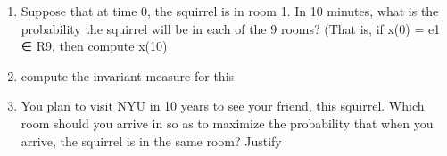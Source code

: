\documentclass[12pt,twoside]{article}
\begin{document}
\begin{enumerate}[label=6.3]
\begin{enumerate}
{\begin{itemize}
\end{itemize}

}
\item Suppose that at time 0, the squirrel is in room 1. In 10 minutes,
what is the probability the squirrel will be in each of the 9 rooms?
(That is, if x(0) = e1 ∈ R9, then compute x(10)
\item compute the invariant measure for this 
\item You plan to visit NYU in 10 years to see your friend, this squirrel.
Which room should you arrive in so as to maximize the probability
that when you arrive, the squirrel is in the same room? Justify
\end{enumerate}
\end{enumerate}
\end{document}
